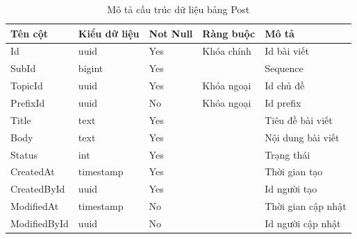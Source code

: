 \documentclass[../index.tex]{subfiles}
\begin{document}
    \begin{table}[H]
        \begin{tabular}{ |p{3cm}|p{2.5cm}|p{1.6cm}|p{2.2cm}|p{3cm}| }
            \hline
            Tên cột      & Kiểu dữ liệu             & Not Null & Ràng buộc  & Mô tả              \\
            \hline
            Id           & uuid                     & Yes      & Khóa chính & Id bài viết        \\
            \hline
            SubId        & bigint                   & Yes      &            & Sequence           \\
            \hline
            TopicId      & uuid                     & Yes      & Khóa ngoại & Id chủ đề          \\
            \hline
            PrefixId     & uuid                     & No       & Khóa ngoại & Id prefix          \\
            \hline
            Title        & text   & Yes      &            & Tiêu đề bài viết   \\
            \hline
            Body         & text                     & Yes      &            & Nội dung bài viết  \\
            \hline
            Status       & int                      & Yes      &            & Trạng thái         \\
            \hline
            CreatedAt    & timestamp & Yes      &            & Thời gian tạo      \\
            \hline
            CreatedById  & uuid                     & Yes      &            & Id người tạo       \\
            \hline
            ModifiedAt   & timestamp & No       &            & Thời gian cập nhật \\
            \hline
            ModifiedById & uuid                     & No       &            & Id người cập nhật  \\
            \hline
        \end{tabular}
        \caption{Mô tả cấu trúc dữ liệu bảng Post}
    \end{table}
\end{document}
